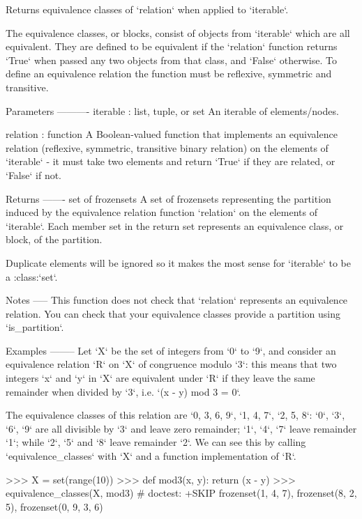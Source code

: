 \begin{DoxyVerb}Returns equivalence classes of `relation` when applied to `iterable`.

The equivalence classes, or blocks, consist of objects from `iterable`
which are all equivalent. They are defined to be equivalent if the
`relation` function returns `True` when passed any two objects from that
class, and `False` otherwise. To define an equivalence relation the
function must be reflexive, symmetric and transitive.

Parameters
----------
iterable : list, tuple, or set
    An iterable of elements/nodes.

relation : function
    A Boolean-valued function that implements an equivalence relation
    (reflexive, symmetric, transitive binary relation) on the elements
    of `iterable` - it must take two elements and return `True` if
    they are related, or `False` if not.

Returns
-------
set of frozensets
    A set of frozensets representing the partition induced by the equivalence
    relation function `relation` on the elements of `iterable`. Each
    member set in the return set represents an equivalence class, or
    block, of the partition.

    Duplicate elements will be ignored so it makes the most sense for
    `iterable` to be a :class:`set`.

Notes
-----
This function does not check that `relation` represents an equivalence
relation. You can check that your equivalence classes provide a partition
using `is_partition`.

Examples
--------
Let `X` be the set of integers from `0` to `9`, and consider an equivalence
relation `R` on `X` of congruence modulo `3`: this means that two integers
`x` and `y` in `X` are equivalent under `R` if they leave the same
remainder when divided by `3`, i.e. `(x - y) mod 3 = 0`.

The equivalence classes of this relation are `{0, 3, 6, 9}`, `{1, 4, 7}`,
`{2, 5, 8}`: `0`, `3`, `6`, `9` are all divisible by `3` and leave zero
remainder; `1`, `4`, `7` leave remainder `1`; while `2`, `5` and `8` leave
remainder `2`. We can see this by calling `equivalence_classes` with
`X` and a function implementation of `R`.

>>> X = set(range(10))
>>> def mod3(x, y): return (x - y) %
>>> equivalence_classes(X, mod3)    # doctest: +SKIP
{frozenset({1, 4, 7}), frozenset({8, 2, 5}), frozenset({0, 9, 3, 6})}
\end{DoxyVerb}
 \mbox{\label{namespacenetworkx_1_1algorithms_1_1minors_1_1contraction_acc9085f86a927aaca2b68c75c8159478}} 

